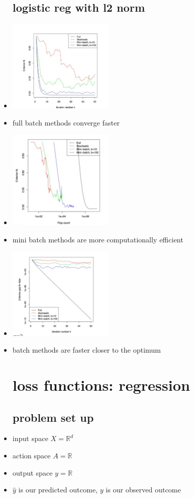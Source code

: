 \documentclass{article}
\begin{document}
\begin{itemize}
\subsection{logistic reg with l2 norm }
\item \includegraphics[width=5cm]{lecture_notes/lecture_2/immages/g_d_3.jpg}
\item full batch methods converge faster 
\item \includegraphics[width=5cm]{lecture_notes/lecture_2/immages/g_d_4.jpg}
\item mini batch methods are more computationally efficient
\item \includegraphics[width=5cm]{lecture_notes/lecture_2/immages/g_d_5.jpg}
\item batch methods are faster closer to the optimum 



\section{loss functions: regression}
\subsection{problem set up}
    \item input space $X=\mathbb{R}^{d}$
    \item action  space $A=\mathbb{R}$
    \item output space $y=\mathbb{R}$
    \item $\hat{y}$ is our predicted outcome, $y$ is our observed outcome 

\end{itemize}
\end{document}
